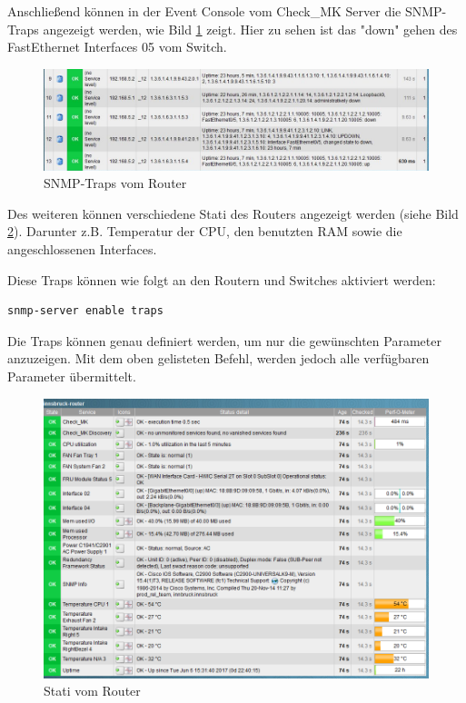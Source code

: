 Anschließend können in der Event Console vom Check\_MK Server die \ac{SNMP}-Traps angezeigt werden, wie Bild \ref{img:console} zeigt. Hier zu sehen ist das "down" gehen des FastEthernet Interfaces  05 vom Switch.

\begin{figure}[H]
	\centering
	\includegraphics[scale=0.59]{img/EventConsole_cut.PNG}
	\caption{SNMP-Traps vom Router}
	\label{img:console}
\end{figure}

Des weiteren können verschiedene Stati des Routers angezeigt werden (siehe Bild \ref{img:router_monitoring}). Darunter z.B. Temperatur der CPU, den benutzten RAM sowie die angeschlossenen Interfaces.

Diese Traps können wie folgt an den Routern und Switches aktiviert werden:
\begin{lstlisting}[caption={Traps aktivieren},label={lst:traps},language={}]
 snmp-server enable traps
\end{lstlisting}

Die Traps können genau definiert werden, um nur die gewünschten Parameter anzuzeigen. Mit dem oben gelisteten Befehl, werden jedoch alle verfügbaren Parameter übermittelt.

\begin{figure}[H]
	\centering
	\includegraphics[scale=0.59]{img/checkmk_router.PNG}
	\caption{Stati vom Router}
	\label{img:router_monitoring}
\end{figure}

